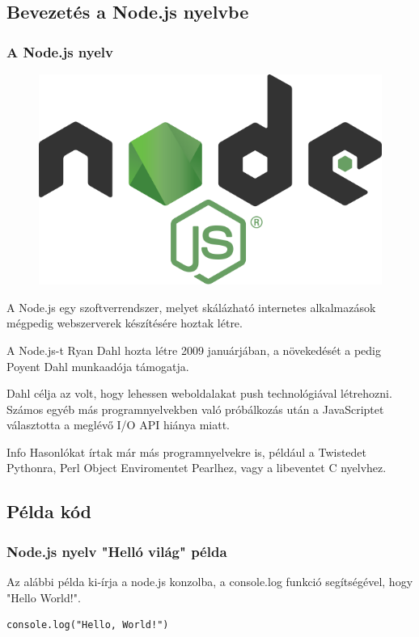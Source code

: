 \documentclass[10pt]{beamer}
\begin{document}
	\subsection{Bevezetés a Node.js nyelvbe}
	\begin{frame}
		\frametitle{A Node.js nyelv}
		\hypertarget{nodejs}{}

		\begin{figure}
			\includegraphics[height=0.12\textwidth]{nodejs-logo.png} %
		\end{figure}

		\hspace{0.25cm} A Node.js egy szoftverrendszer, melyet skálázható internetes
		alkalmazások mégpedig webszerverek készítésére hoztak létre.\pause

		\vspace{0.5cm}
		\hspace{0.25cm} A Node.js-t Ryan Dahl hozta létre 2009 januárjában, a
		növekedését a pedig Poyent Dahl munkaadója támogatja.\pause

		\vspace{0.5cm}
		\hspace{0.25cm} Dahl célja az volt, hogy lehessen weboldalakat push
		technológiával létrehozni. Számos egyéb más programnyelvekben való próbálkozás
		után a JavaScriptet választotta a meglévő I/O API hiánya miatt. \pause

		\vspace{1cm}
		\begin{block}{Info}
			Hasonlókat írtak már más programnyelvekre is, például a Twistedet Pythonra,
			Perl Object Enviromentet Pearlhez, vagy a libeventet C nyelvhez.
		\end{block}
	\end{frame}

	\subsection{Példa kód}
	\begin{frame}[fragile]
		\frametitle{Node.js nyelv "Helló világ" példa}

		Az alábbi példa ki-írja a node.js konzolba, a console.log funkció segítségével,
		hogy "Hello World!".
		\begin{lstlisting}[language=Dummy]
    console.log("Hello, World!")
  \end{lstlisting}
	\end{frame}
\end{document}
